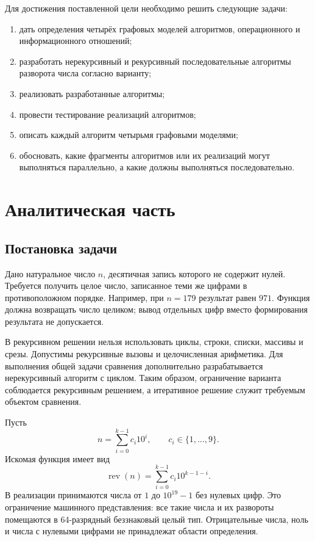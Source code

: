 \documentclass[14pt,a4paper]{extarticle}
\numberwithin{equation}{section}
\numberwithin{figure}{section}
\numberwithin{table}{section}
\begin{document}
Для достижения поставленной цели необходимо решить следующие задачи:
\begin{enumerate}
\item дать определения четырёх графовых моделей алгоритмов, операционного и информационного отношений;
\item разработать нерекурсивный и рекурсивный последовательные алгоритмы разворота числа согласно варианту;
\item реализовать разработанные алгоритмы;
\item провести тестирование реализаций алгоритмов;
\item описать каждый алгоритм четырьмя графовыми моделями;
\item обосновать, какие фрагменты алгоритмов или их реализаций могут выполняться параллельно, а какие должны выполняться последовательно.
\end{enumerate}

\clearpage\section{Аналитическая часть}
\subsection{Постановка задачи}
Дано натуральное число $n$, десятичная запись которого не содержит нулей. Требуется получить целое число, записанное теми же цифрами в противоположном порядке. Например, при $n=179$ результат равен $971$. Функция должна возвращать число целиком; вывод отдельных цифр вместо формирования результата не допускается.

В рекурсивном решении нельзя использовать циклы, строки, списки, массивы и срезы. Допустимы рекурсивные вызовы и целочисленная арифметика. Для выполнения общей задачи сравнения дополнительно разрабатывается нерекурсивный алгоритм с циклом. Таким образом, ограничение варианта соблюдается рекурсивным решением, а итеративное решение служит требуемым объектом сравнения.

Пусть
\begin{equation}
n=\sum_{i=0}^{k-1} c_i10^i,\qquad c_i\in\{1,\ldots,9\}.
\end{equation}
Искомая функция имеет вид
\begin{equation}
\operatorname{rev}(n)=\sum_{i=0}^{k-1}c_i10^{k-1-i}.
\end{equation}
В реализации принимаются числа от $1$ до $10^{19}-1$ без нулевых цифр. Это ограничение машинного представления: все такие числа и их развороты помещаются в 64-разрядный беззнаковый целый тип. Отрицательные числа, ноль и числа с нулевыми цифрами не принадлежат области определения.
\end{document}
